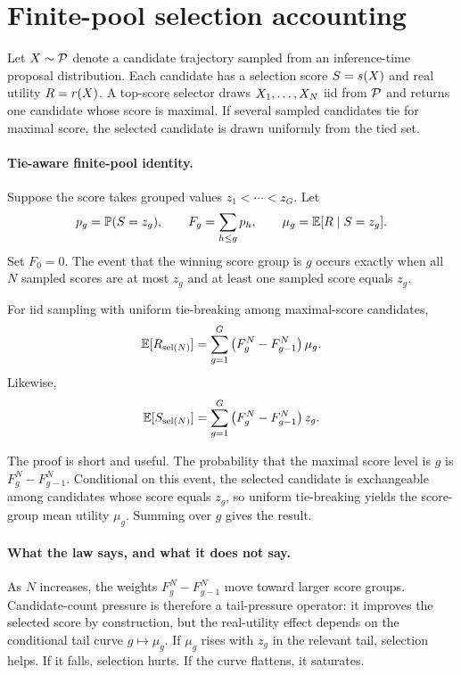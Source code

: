 \section{Finite-pool selection accounting}
\label{sec:theory}

Let $X \sim \mathcal{P}$ denote a candidate trajectory sampled from an inference-time proposal distribution. Each candidate has a selection score $S=s(X)$ and real utility $R=r(X)$. A top-score selector draws $X_1,\ldots,X_N$ iid from $\mathcal{P}$ and returns one candidate whose score is maximal. If several sampled candidates tie for maximal score, the selected candidate is drawn uniformly from the tied set.

\paragraph{Tie-aware finite-pool identity.}
Suppose the score takes grouped values $z_1 < \cdots < z_G$. Let
\[
  p_g = \mathbb{P}(S=z_g), \qquad
  F_g = \sum_{h \leq g} p_h, \qquad
  \mu_g = \mathbb{E}[R \mid S=z_g].
\]
Set $F_0=0$. The event that the winning score group is $g$ occurs exactly when all $N$ sampled scores are at most $z_g$ and at least one sampled score equals $z_g$.

\begin{proposition}
\label{prop:law}
For iid sampling with uniform tie-breaking among maximal-score candidates,
\[
  \mathbb{E}[R_{\operatorname{sel}(N)}]
  =
  \sum_{g=1}^{G}
  \left(F_g^N - F_{g-1}^N\right)\mu_g.
\]
Likewise,
\[
  \mathbb{E}[S_{\operatorname{sel}(N)}]
  =
  \sum_{g=1}^{G}
  \left(F_g^N - F_{g-1}^N\right)z_g.
\]
\end{proposition}

The proof is short and useful. The probability that the maximal score level is $g$ is $F_g^N-F_{g-1}^N$. Conditional on this event, the selected candidate is exchangeable among candidates whose score equals $z_g$, so uniform tie-breaking yields the score-group mean utility $\mu_g$. Summing over $g$ gives the result.

\paragraph{What the law says, and what it does not say.}
As $N$ increases, the weights $F_g^N-F_{g-1}^N$ move toward larger score groups. Candidate-count pressure is therefore a tail-pressure operator: it improves the selected score by construction, but the real-utility effect depends on the conditional tail curve $g \mapsto \mu_g$. If $\mu_g$ rises with $z_g$ in the relevant tail, selection helps. If it falls, selection hurts. If the curve flattens, it saturates.

